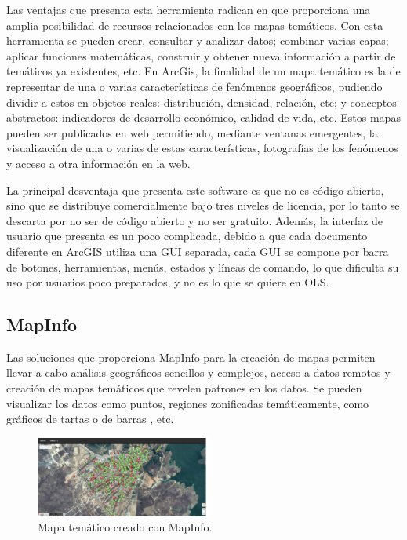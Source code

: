 Las ventajas que presenta esta herramienta radican en que proporciona una amplia posibilidad de recursos relacionados con los mapas tem\'aticos. Con esta herramienta se pueden crear, consultar y analizar datos; combinar varias capas; aplicar funciones matem\'aticas, construir y obtener nueva informaci\'on a partir de tem\'aticos ya existentes, etc. En ArcGis, la finalidad de un mapa tem\'atico es la de representar de una o varias caracter\'isticas de fen\'omenos geogr\'aficos, pudiendo dividir a estos en objetos reales: distribuci\'on, densidad, relaci\'on, etc; y conceptos abstractos: indicadores de desarrollo econ\'omico, calidad de vida, etc. Estos mapas pueden ser publicados en web permitiendo, mediante ventanas emergentes, la visualizaci\'on de una o varias de estas caracter\'isticas,  fotograf\'ias de los fen\'omenos y acceso a otra informaci\'on en la web. \cite{ART} 

La principal desventaja que presenta este software es que no es c\'odigo abierto, sino que se distribuye comercialmente bajo tres niveles de licencia, por lo tanto se descarta por no ser de c\'odigo abierto y no ser gratuito. Adem\'as, la interfaz de usuario que presenta es un poco complicada, debido a que cada documento diferente en ArcGIS utiliza una GUI separada, cada GUI se compone por barra de botones, herramientas, men\'us, estados y l\'ineas de comando, lo que dificulta su uso por usuarios poco preparados, y no es lo que se quiere en OLS.


\subsection{MapInfo}
Las soluciones que proporciona MapInfo \cite{mapinfo} para la creaci\'on de mapas permiten llevar a cabo an\'alisis geogr\'aficos sencillos y complejos, acceso a datos remotos y creaci\'on de mapas tem\'aticos que revelen patrones en los datos. Se pueden visualizar los datos como puntos, regiones zonificadas tem\'aticamente, como gr\'aficos de tartas o de barras , etc.

\begin{figure}
\vspace{-20pt}
\begin{center}
\includegraphics[width=0.52\textwidth]{images/mapInfoTematic.jpg} 
\end{center} \vspace{-20pt} \caption{Mapa tem\'atico creado con MapInfo.}  \label{mapinfo} \vspace{-10pt} 
\end{figure}

